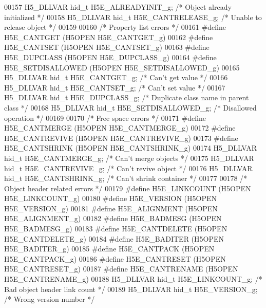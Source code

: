 \begin{DoxyCode}
00157 H5\_DLLVAR hid\_t H5E\_ALREADYINIT\_g;   \textcolor{comment}{/* Object already initialized */}
00158 H5\_DLLVAR hid\_t H5E\_CANTRELEASE\_g;   \textcolor{comment}{/* Unable to release object */}
00159 
00160 \textcolor{comment}{/* Property list errors */}
00161 \textcolor{preprocessor}{#define H5E\_CANTGET          (H5OPEN H5E\_CANTGET\_g)}
00162 \textcolor{preprocessor}{#define H5E\_CANTSET          (H5OPEN H5E\_CANTSET\_g)}
00163 \textcolor{preprocessor}{#define H5E\_DUPCLASS         (H5OPEN H5E\_DUPCLASS\_g)}
00164 \textcolor{preprocessor}{#define H5E\_SETDISALLOWED    (H5OPEN H5E\_SETDISALLOWED\_g)}
00165 H5\_DLLVAR hid\_t H5E\_CANTGET\_g;       \textcolor{comment}{/* Can't get value */}
00166 H5\_DLLVAR hid\_t H5E\_CANTSET\_g;       \textcolor{comment}{/* Can't set value */}
00167 H5\_DLLVAR hid\_t H5E\_DUPCLASS\_g;      \textcolor{comment}{/* Duplicate class name in parent class */}
00168 H5\_DLLVAR hid\_t H5E\_SETDISALLOWED\_g; \textcolor{comment}{/* Disallowed operation */}
00169 
00170 \textcolor{comment}{/* Free space errors */}
00171 \textcolor{preprocessor}{#define H5E\_CANTMERGE        (H5OPEN H5E\_CANTMERGE\_g)}
00172 \textcolor{preprocessor}{#define H5E\_CANTREVIVE       (H5OPEN H5E\_CANTREVIVE\_g)}
00173 \textcolor{preprocessor}{#define H5E\_CANTSHRINK       (H5OPEN H5E\_CANTSHRINK\_g)}
00174 H5\_DLLVAR hid\_t H5E\_CANTMERGE\_g;     \textcolor{comment}{/* Can't merge objects */}
00175 H5\_DLLVAR hid\_t H5E\_CANTREVIVE\_g;    \textcolor{comment}{/* Can't revive object */}
00176 H5\_DLLVAR hid\_t H5E\_CANTSHRINK\_g;    \textcolor{comment}{/* Can't shrink container */}
00177 
00178 \textcolor{comment}{/* Object header related errors */}
00179 \textcolor{preprocessor}{#define H5E\_LINKCOUNT        (H5OPEN H5E\_LINKCOUNT\_g)}
00180 \textcolor{preprocessor}{#define H5E\_VERSION          (H5OPEN H5E\_VERSION\_g)}
00181 \textcolor{preprocessor}{#define H5E\_ALIGNMENT        (H5OPEN H5E\_ALIGNMENT\_g)}
00182 \textcolor{preprocessor}{#define H5E\_BADMESG          (H5OPEN H5E\_BADMESG\_g)}
00183 \textcolor{preprocessor}{#define H5E\_CANTDELETE       (H5OPEN H5E\_CANTDELETE\_g)}
00184 \textcolor{preprocessor}{#define H5E\_BADITER          (H5OPEN H5E\_BADITER\_g)}
00185 \textcolor{preprocessor}{#define H5E\_CANTPACK         (H5OPEN H5E\_CANTPACK\_g)}
00186 \textcolor{preprocessor}{#define H5E\_CANTRESET        (H5OPEN H5E\_CANTRESET\_g)}
00187 \textcolor{preprocessor}{#define H5E\_CANTRENAME       (H5OPEN H5E\_CANTRENAME\_g)}
00188 H5\_DLLVAR hid\_t H5E\_LINKCOUNT\_g;     \textcolor{comment}{/* Bad object header link count */}
00189 H5\_DLLVAR hid\_t H5E\_VERSION\_g;       \textcolor{comment}{/* Wrong version number */}

\end{DoxyCode}
